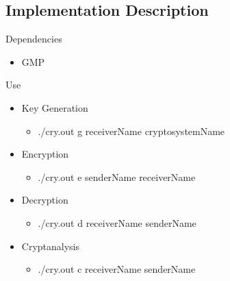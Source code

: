 \subsection{Implementation Description}


Dependencies
\begin{itemize}
  \item GMP
\end{itemize}

Use
\begin{itemize}
  \item Key Generation
  \begin{itemize}
    \item ./cry.out g receiverName cryptosystemName
  \end{itemize}
  \item Encryption
  \begin{itemize}
    \item ./cry.out e senderName receiverName
  \end{itemize}
  \item Decryption
  \begin{itemize}
    \item ./cry.out d receiverName senderName
  \end{itemize}
  \item Cryptanalysis
  \begin{itemize}
    \item ./cry.out c receiverName senderName
  \end{itemize}
\end{itemize}
